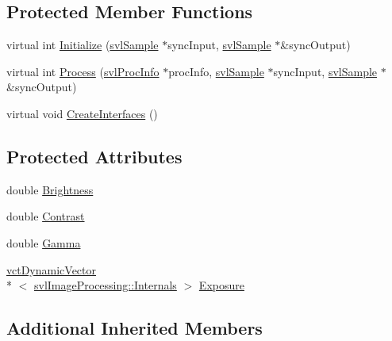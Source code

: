 \subsection*{Protected Member Functions}
\begin{DoxyCompactItemize}
\item 
virtual int \hyperlink{classsvl_filter_image_exposure_correction_abdc44ef630e2469191dd3ab612f99838}{Initialize} (\hyperlink{classsvl_sample}{svl\-Sample} $\ast$sync\-Input, \hyperlink{classsvl_sample}{svl\-Sample} $\ast$\&sync\-Output)
\item 
virtual int \hyperlink{classsvl_filter_image_exposure_correction_ab47687ddddbdcd976cfcd2fdd37aa157}{Process} (\hyperlink{structsvl_proc_info}{svl\-Proc\-Info} $\ast$proc\-Info, \hyperlink{classsvl_sample}{svl\-Sample} $\ast$sync\-Input, \hyperlink{classsvl_sample}{svl\-Sample} $\ast$\&sync\-Output)
\item 
virtual void \hyperlink{classsvl_filter_image_exposure_correction_af45aa60ce8ea8bae41bdd3517eb0f35d}{Create\-Interfaces} ()
\end{DoxyCompactItemize}
\subsection*{Protected Attributes}
\begin{DoxyCompactItemize}
\item 
double \hyperlink{classsvl_filter_image_exposure_correction_adc6d7d11d473e8cfc11aaedb397c3a44}{Brightness}
\item 
double \hyperlink{classsvl_filter_image_exposure_correction_a9dea6bb5e12150a39cc0c68b7688a099}{Contrast}
\item 
double \hyperlink{classsvl_filter_image_exposure_correction_a0bda9bde283f1fd9dc89780fc38f5eeb}{Gamma}
\item 
\hyperlink{classvct_dynamic_vector}{vct\-Dynamic\-Vector}\\*
$<$ \hyperlink{classsvl_image_processing_1_1_internals}{svl\-Image\-Processing\-::\-Internals} $>$ \hyperlink{classsvl_filter_image_exposure_correction_ad9a373e1d45905e9ce684d07985f5b41}{Exposure}
\end{DoxyCompactItemize}
\subsection*{Additional Inherited Members}


